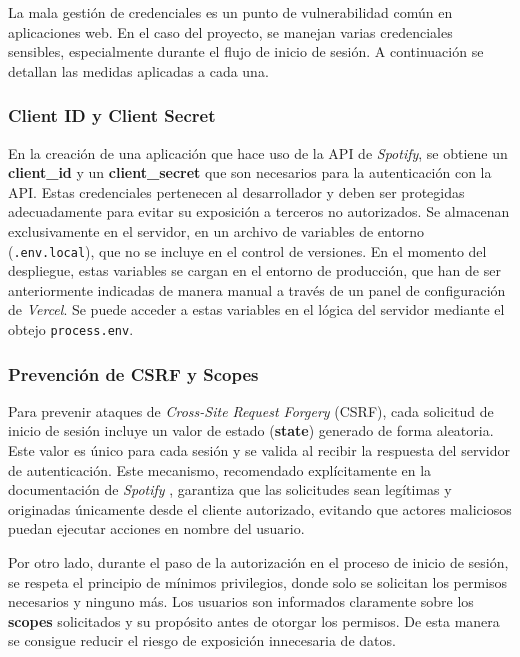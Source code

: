La mala gestión de credenciales es un punto de vulnerabilidad común en aplicaciones web. En el caso del proyecto, se manejan varias credenciales sensibles, especialmente durante el flujo de inicio de sesión. A continuación se detallan las medidas aplicadas a cada una.

\subsubsection*{Client ID y Client Secret}

En la creación de una aplicación que hace uso de la API de \textit{Spotify}, se obtiene un \textbf{client\_id} y un \textbf{client\_secret} que son necesarios para la autenticación con la API. Estas credenciales pertenecen al desarrollador y deben ser protegidas adecuadamente para evitar su exposición a terceros no autorizados. Se almacenan exclusivamente en el servidor, en un archivo de variables de entorno (\texttt{.env.local}), que no se incluye en el control de versiones. En el momento del despliegue, estas variables se cargan en el entorno de producción, que han de ser anteriormente indicadas de manera manual a través de un panel de configuración de \textit{Vercel}. Se puede acceder a estas variables en el lógica del servidor mediante el obtejo \texttt{process.env}.

\subsubsection*{Prevención de CSRF y Scopes}

Para prevenir ataques de \textit{Cross-Site Request Forgery} (CSRF), cada solicitud de inicio de sesión incluye un valor de estado (\textbf{state}) generado de forma aleatoria. Este valor es único para cada sesión y se valida al recibir la respuesta del servidor de autenticación. Este mecanismo, recomendado explícitamente en la documentación de \textit{Spotify} \cite{spotifyAuthCodeFlow2025}, garantiza que las solicitudes sean legítimas y originadas únicamente desde el cliente autorizado, evitando que actores maliciosos puedan ejecutar acciones en nombre del usuario.

Por otro lado, durante el paso de la autorización en el proceso de inicio de sesión, se respeta el principio de mínimos privilegios, donde solo se solicitan los permisos necesarios y ninguno más. Los usuarios son informados claramente sobre los \textbf{scopes} solicitados y su propósito antes de otorgar los permisos. De esta manera se consigue reducir el riesgo de exposición innecesaria de datos.

